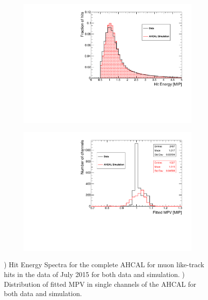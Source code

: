 \begin{figure}[htbp!]
	\begin{subfigure}[t]{0.5\textwidth}
		\centering
		\includegraphics[width=1\linewidth]{../Thesis_Plots/EnergyCalib/Plots/ComparisonMCData_MIPPeak.pdf}
		\caption{} \label{fig:MIPData_MC}
	\end{subfigure}
	\hfill
	\begin{subfigure}[t]{0.5\textwidth}
		\centering
		\includegraphics[width=1\linewidth]{../Thesis_Plots/EnergyCalib/Plots/ComparisonMCData_MPV.pdf}
		\caption{} \label{fig:MPVData_MC}
	\end{subfigure}
	\caption{) Hit Energy Spectra for the complete AHCAL for muon like-track hits in the data of July 2015 for both data and simulation. ) Distribution of fitted MPV in single channels of the AHCAL for both data and simulation.}
\end{figure}

